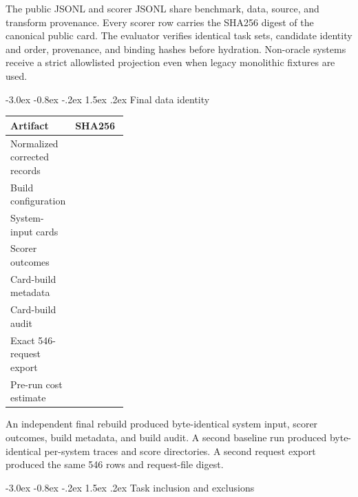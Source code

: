 \documentclass[10pt,a4paper]{article}
\makeatletter
\renewcommand\section{\@startsection{section}{1}{\z@}%
  {-3.0ex \@plus -0.8ex \@minus -.2ex}%
  {1.5ex \@plus .2ex}%
  {\normalfont\Large\bfseries}}
\makeatother
\begin{document}
The public JSONL and scorer JSONL share benchmark, data, source, and transform
provenance. Every scorer row carries the SHA256 digest of the canonical public
card. The evaluator verifies identical task sets, candidate identity and order,
provenance, and binding hashes before hydration. Non-oracle systems receive a
strict allowlisted projection even when legacy monolithic fixtures are used.

\section{Final data identity}

\begin{table}[h]
\centering
\small
\begin{tabularx}{\linewidth}{@{}p{0.34\linewidth}Y@{}}
\toprule
\textbf{Artifact} & \textbf{SHA256} \\
\midrule
Normalized corrected records &  \\
Build configuration &  \\
System-input cards &  \\
Scorer outcomes &  \\
Card-build metadata &  \\
Card-build audit &  \\
Exact 546-request export &  \\
Pre-run cost estimate &  \\
\bottomrule
\end{tabularx}
\end{table}

An independent final rebuild produced byte-identical system input, scorer
outcomes, build metadata, and build audit. A second baseline run produced
byte-identical per-system traces and score directories. A second request export
produced the same 546 rows and request-file digest.

\section{Task inclusion and exclusions}
\end{document}
